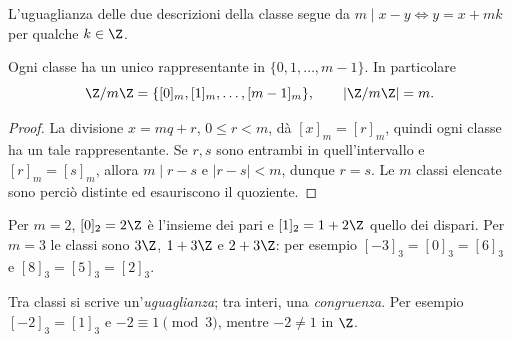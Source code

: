 L'uguaglianza delle due descrizioni della classe segue da $m\mid x-y\iff y=x+mk$ per qualche $k\in\Z$.

\begin{proposizione}
Ogni classe ha un unico rappresentante in $\{0,1,\ldots,m-1\}$. In particolare
\[
\Z/m\Z=\{[0]_m,[1]_m,\ldots,[m-1]_m\},\qquad |\Z/m\Z|=m.
\]
\end{proposizione}
\begin{proof}
La divisione $x=mq+r$, $0\le r<m$, dà $[x]_m=[r]_m$, quindi ogni classe ha un tale rappresentante. Se $r,s$ sono entrambi in quell'intervallo e $[r]_m=[s]_m$, allora $m\mid r-s$ e $|r-s|<m$, dunque $r=s$. Le $m$ classi elencate sono perciò distinte ed esauriscono il quoziente.
\end{proof}

\begin{esempio}
Per $m=2$, $[0]_2=2\Z$ è l'insieme dei pari e $[1]_2=1+2\Z$ quello dei dispari. Per $m=3$ le classi sono $3\Z$, $1+3\Z$ e $2+3\Z$: per esempio $[-3]_3=[0]_3=[6]_3$ e $[8]_3=[5]_3=[2]_3$.
\end{esempio}

\begin{schema}
\end{schema}

\begin{osservazione}
Tra classi si scrive un'\emph{uguaglianza}; tra interi, una \emph{congruenza}. Per esempio $[-2]_3=[1]_3$ e $-2\equiv1\pmod3$, mentre $-2\ne1$ in $\Z$.
\end{osservazione}

